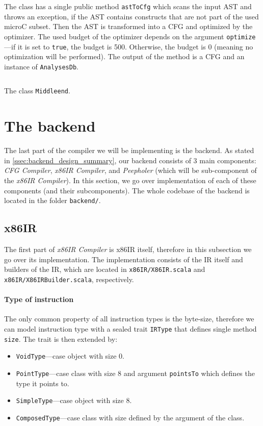 \documentclass[thesis=M,english]{FITthesis}[2019/12/23]
\begin{document}
The class has a single public method \texttt{astToCfg} which scans the input AST and throws an exception, if the AST contains constructs that are not part of the used microC subset. Then the AST is transformed into a CFG and optimized by the optimizer. The used budget of the optimizer depends on the argument \texttt{optimize}---if it is set to \texttt{true}, the budget is 500. Otherwise, the budget is 0 (meaning no optimization will be performed). The output of the method is a CFG and an instance of \texttt{AnalysesDb}.

\begin{listing}[H]
	\inputminted[tabsize=2,breaklines,bgcolor=codebg]{scala}{snippets/middleend_interface.m}
	\caption{The class \texttt{Middleend}.}
	\label{lst:middleend_interface}
\end{listing}

\section{The backend}
The last part of the compiler we will be implementing is the backend. As stated in \autoref{ssec:backend_design_summary}, our backend consists of 3 main components: \emph{CFG Compiler}, \emph{x86IR Compiler}, and \emph{Peepholer} (which will be sub-component of the \emph{x86IR Compiler}). In this section, we go over implementation of each of these components (and their subcomponents). The whole codebase of the backend is located in the folder \texttt{backend/}.

\subsection{x86IR}
The first part of \emph{x86IR Compiler} is x86IR itself, therefore in this subsection we go over its implementation. The implementation consists of the IR itself and builders of the IR, which are located in \texttt{x86IR/X86IR.scala} and \texttt{x86IR/X86IRBuilder.scala}, respectively.

\paragraph*{Type of instruction} The only common property of all instruction types is the byte-size, therefore we can model instruction type with a sealed trait \texttt{IRType} that defines single method \texttt{size}. The trait is then extended by:
\begin{itemize}
    \item \texttt{VoidType}---case object with size 0.
    \item \texttt{PointType}---case class with size 8 and argument \texttt{pointsTo} which defines the type it points to.
    \item \texttt{SimpleType}---case object with size 8.
    \item \texttt{ComposedType}---case class with size defined by the argument of the class.
\end{itemize}
\end{document}

